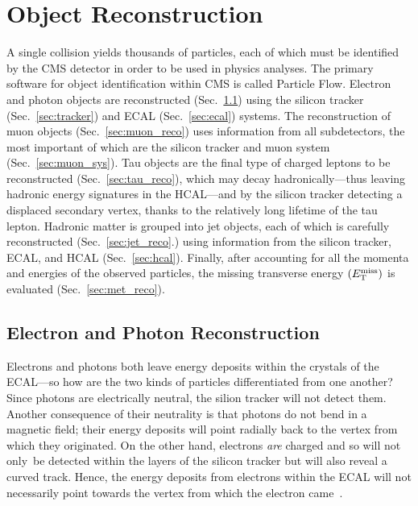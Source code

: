 \section{Object Reconstruction}
\label{sec:obj_reco}
A single \pp collision yields thousands of particles, each of which must be identified by the CMS detector in order to be used in physics analyses.
The primary software for object identification within CMS is called Particle Flow. %
Electron and photon objects are reconstructed (Sec.~\ref{sec:egamma_reco}) using the silicon tracker (Sec.~\ref{sec:tracker}) and ECAL (Sec.~\ref{sec:ecal}) systems.
The reconstruction of muon objects (Sec.~\ref{sec:muon_reco}) uses information from all subdetectors, the most important of which are the silicon tracker and muon system (Sec.~\ref{sec:muon_sys}).
Tau objects are the final type of charged leptons to be reconstructed (Sec.~\ref{sec:tau_reco}), which may decay hadronically---thus leaving hadronic energy signatures in the HCAL---and by the silicon tracker detecting a displaced secondary vertex, thanks to the relatively long lifetime of the tau lepton.  %
Hadronic matter is grouped into jet objects, each of which is carefully reconstructed (Sec.~\ref{sec:jet_reco}.) using information from the silicon tracker, ECAL, and HCAL (Sec.~\ref{sec:hcal}).
Finally, after accounting for all the momenta and energies of the observed particles, the missing transverse energy $\left( E_{\mathrm{T}}^{\text{miss}} \right)$ is evaluated (Sec.~\ref{sec:met_reco}).


\subsection{Electron and Photon Reconstruction}
\label{sec:egamma_reco}
Electrons and photons both leave energy deposits within the crystals of the ECAL---so how are the two kinds of particles differentiated from one another?
Since photons are electrically neutral, the silion tracker will not detect them.
Another consequence of their neutrality is that photons do not bend in a magnetic field;
their energy deposits will point radially back to the vertex from which they originated.
On the other hand, electrons \emph{are} charged and so will not only be detected within the layers of the silicon tracker but will also reveal a curved track.
Hence, the energy deposits from electrons within the ECAL will not necessarily point towards the vertex from which the electron came~\cite{Ereco_performance_2015}.

